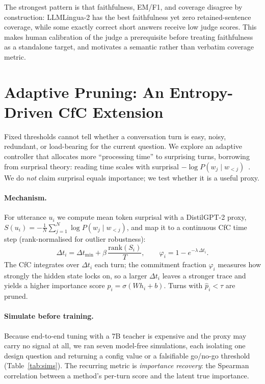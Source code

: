 \documentclass[runningheads]{llncs}
\begin{document}
The strongest pattern is that faithfulness, EM/F1, and coverage disagree by
construction: LLMLingua-2 has the best faithfulness yet zero retained-sentence
coverage, while some exactly correct short answers receive low judge scores.
This makes human calibration of the judge a prerequisite before treating
faithfulness as a standalone target, and motivates a semantic rather than
verbatim coverage metric.

\section{Adaptive Pruning: An Entropy-Driven CfC Extension}\label{sec:cfc}

Fixed thresholds cannot tell whether a conversation turn is easy, noisy,
redundant, or load-bearing for the current question. We explore an adaptive
controller that allocates more ``processing time'' to surprising turns,
borrowing from surprisal theory: reading time scales with surprisal
$-\log P(w_j\mid w_{<j})$~\cite{levy2008,smith2013}. We do \emph{not} claim
surprisal equals importance; we test whether it is a useful proxy.

\paragraph{Mechanism.}
For utterance $u_i$ we compute mean token surprisal with a DistilGPT-2 proxy,
$S(u_i) = -\tfrac{1}{N}\sum_{j=1}^{N}\log P(w_j\mid w_{<j})$, and map it to a
continuous CfC time step (rank-normalised for outlier robustness):
\begin{equation}
\Delta t_i = \Delta t_{\min} + \beta\,\frac{\mathrm{rank}(S_i)}{T},
\qquad
\varphi_i = 1 - e^{-\lambda\,\Delta t_i}.
\end{equation}
The CfC integrates over $\Delta t_i$ each turn; the commitment fraction
$\varphi_i$ measures how strongly the hidden state locks on, so a larger
$\Delta t_i$ leaves a stronger trace and yields a higher importance score
$\hat p_i = \sigma(Wh_i + b)$. Turns with $\hat p_i < \tau$ are pruned.

\paragraph{Simulate before training.}
Because end-to-end tuning with a 7B teacher is expensive and the proxy may carry
no signal at all, we ran seven model-free simulations, each isolating one design
question and returning a config value or a falsifiable go/no-go threshold
(Table~\ref{tab:sims}). The recurring metric is \emph{importance recovery}: the
Spearman correlation between a method's per-turn score and the latent true
importance.
\end{document}
